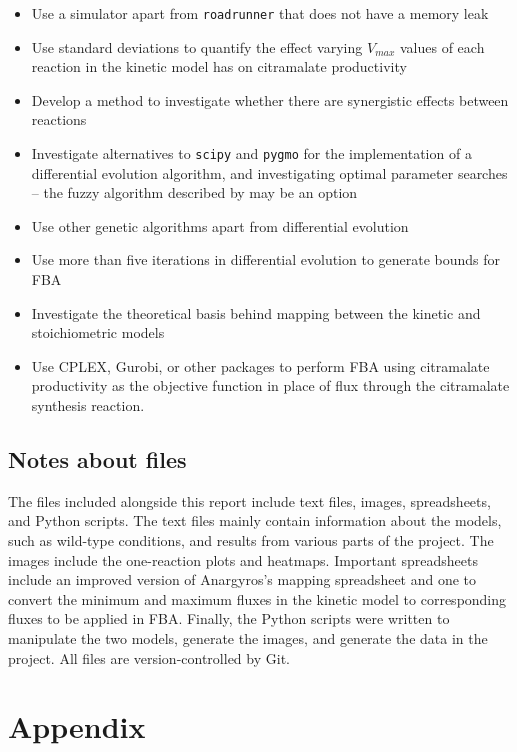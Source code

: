 \documentclass[parskip=full, numbers=noenddot]{scrreprt}
\begin{document}
\begin{itemize}
\item Use a simulator apart from \texttt{roadrunner} that does not have a memory leak
\item Use standard deviations to quantify the effect varying $V_{max}$ values of each reaction in the kinetic model has on citramalate productivity
\item Develop a method to investigate whether there are synergistic effects between reactions
\item Investigate alternatives to \texttt{scipy} and \texttt{pygmo} for the implementation of a differential evolution algorithm, and investigating optimal parameter searches -- the fuzzy algorithm described by \citet{liu_fuzzy_2005} may be an option
\item Use other genetic algorithms apart from differential evolution
\item Use more than five iterations in differential evolution to generate bounds for FBA
\item Investigate the theoretical basis behind mapping between the kinetic and stoichiometric models
  \item Use CPLEX, Gurobi, or other packages to perform FBA using citramalate productivity as the objective function in place of flux through the citramalate synthesis reaction.
\end{itemize}
  
\section{Notes about files}
\label{sec:files}

The files included alongside this report include text files, images, spreadsheets, and Python scripts. The text files mainly contain information about the models, such as wild-type conditions, and results from various parts of the project. The images include the one-reaction plots and heatmaps. Important spreadsheets include an improved version of Anargyros's mapping spreadsheet and one to convert the minimum and maximum fluxes in the kinetic model to corresponding fluxes to be applied in FBA. Finally, the Python scripts were written to manipulate the two models, generate the images, and generate the data in the project. All files are version-controlled by Git.

\appendix
\chapter*{Appendix}
\renewcommand{\thesection}{\Alph{section}}
\end{document}
